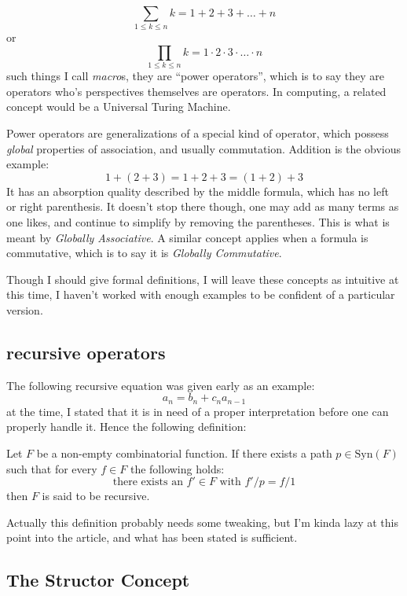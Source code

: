 \documentclass[twoside]{article}
\newenvironment{definition}[1][Definition]{\begin{trivlist}
\item[\hskip \labelsep {\bfseries #1}]}{\end{trivlist}}
\begin{document}
$$ \sum_{1\le k\le n}k=1+2+3+\ldots+n $$
or
$$ \prod_{1\le k\le n}k=1\cdot 2\cdot 3\cdot\ldots\cdot n $$
such things I call \emph{macro}s, they are ``power operators'', which is to say they are operators who's
perspectives themselves are operators.  In computing, a related concept would be a Universal Turing Machine.

Power operators are generalizations of a special kind of operator, which possess \emph{global} properties of
association, and usually commutation.  Addition is the obvious example:
$$ 1+(2+3)=1+2+3=(1+2)+3 $$
It has an absorption quality described by the middle formula, which has no left or right parenthesis.  It
doesn't stop there though, one may add as many terms as one likes, and continue to simplify by removing the
parentheses.  This is what is meant by \emph{Globally Associative}.  A similar concept applies when a formula
is commutative, which is to say it is \emph{Globally Commutative}.

Though I should give formal definitions, I will leave these concepts as intuitive at this time, I haven't worked
with enough examples to be confident of a particular version.

\subsection{recursive operators}

The following recursive equation was given early as an example:
$$ a_n=b_n+c_na_{n-1} $$
at the time, I stated that it is in need of a proper interpretation before one can properly handle it.  Hence the
following definition:

\begin{definition}[Recursive Operator]

Let $ F $ be a non-empty combinatorial function.  If there exists a path $ p\in\mbox{Syn}(F) $ such that for every
$ f\in F $ the following holds:
$$ \mbox{there exists an }f'\in F\mbox{ with } f'/p=f/1 $$
then $ F $ is said to be recursive.

\end{definition}
Actually this definition probably needs some tweaking, but I'm kinda lazy at this point into the article,
and what has been stated is sufficient.

\subsection{The Structor Concept}
\end{document}
